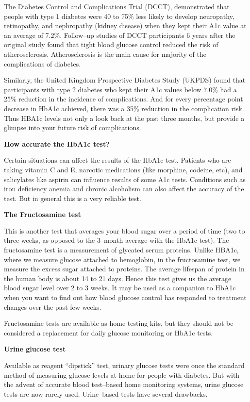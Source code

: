 The Diabetes Control and Complications Trial (DCCT), demonstrated that people with type 1 diabetes were 40 to 75\% less likely to develop neuropathy, retinopathy, and nephropathy (kidney disease) when they kept their A1c value at an average of 7.2\%. Follow–up studies of DCCT participants 6 years after the original study found that tight blood glucose control reduced the risk of atherosclerosis. Atherosclerosis is the main cause for majority of the complications of diabetes.

Similarly, the United Kingdom Prospective Diabetes Study (UKPDS) found that participants with type 2 diabetes who kept their A1c values below 7.0\% had a 25\% reduction in the incidence of complications. And for every percentage point decrease in HbA1c achieved, there was a 35\% reduction in the complication risk. Thus HBA1c levels not only a look back at the past three months, but provide a glimpse into your future risk of complications.

\textbf{How accurate the HbA1c test?}

Certain situations can affect the results of the HbA1c test. Patients who are taking vitamin C and E, narcotic medications (like morphine, codeine, etc), and salicylates like aspirin can influence results of some A1c tests. Conditions such as iron deficiency anemia and chronic alcoholism can also affect the accuracy of the test. But in general this is a very reliable test.

\textbf{The Fructosamine test}

This is another test that averages your blood sugar over a period of time (two to three weeks, as opposed to the 3–month average with the HbA1c test). The fructosamine test is a measurement of glycated serum proteins. Unlike HBA1c, where we measure glucose attached to hemoglobin, in the fructosamine test, we measure the excess sugar attached to proteins. The average lifespan of protein in the human body is about 14 to 21 days. Hence this test gives us the average blood sugar level over 2 to 3 weeks. It may be used as a companion to HbA1c when you want to find out how blood glucose control has responded to treatment changes over the past few weeks.

Fructosamine tests are available as home testing kits, but they should not be considered a replacement for daily glucose monitoring or HbA1c tests.

\textbf{Urine glucose test}

Available as reagent “dipstick” test, urinary glucose tests were once the standard method of measuring glucose levels at home for people with diabetes. But with the advent of accurate blood test–based home monitoring systems, urine glucose tests are now rarely used. Urine–based tests have several drawbacks.

